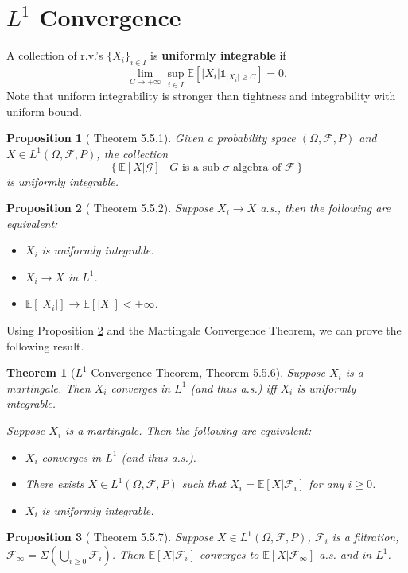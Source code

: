 \documentclass[openany]{book}
\newtheorem{proposition}{Proposition}[chapter]
\newtheorem{theorem}{Theorem}[chapter]
\theoremstyle{definition}
\theoremstyle{remark}
\begin{document}
\section{$L^1$ Convergence}
A collection of r.v.'s $\{X_i\}_{i\in I}$ is \textbf{uniformly integrable} if
\begin{equation*}
    \lim_{C\to+\infty}\sup_{i\in I}\mathbb{E}\left[|X_i|\mathds{1}_{|X_i|\ge C}\right]=0.
\end{equation*}
Note that uniform integrability is stronger than tightness and integrability with uniform bound.
\begin{proposition}[\cite{D10} Theorem 5.5.1]
    Given a probability space $(\Omega,\mathcal{F},P)$ and $X\in L^1(\Omega,\mathcal{F},P)$, the collection
    \begin{equation*}
        \left\{\mathbb{E}[X|\mathcal{G}]\middle|G\textrm{ is a sub-}\sigma\textrm{-algebra of }\mathcal{F}\right\}
    \end{equation*}
    is uniformly integrable.
\end{proposition}
\begin{proposition}[\cite{D10} Theorem 5.5.2]\label{prop:L1Converge}
    Suppose $X_i\to X$ a.s., then the following are equivalent:
    \begin{itemize}
        \item $X_i$ is uniformly integrable.
        \item $X_i\to X$ in $L^1$.
        \item $\mathbb{E}\left[|X_i|\right]\to \mathbb{E}\left[|X|\right]<+\infty$.
    \end{itemize}
\end{proposition}
Using Proposition \ref{prop:L1Converge} and the Martingale Convergence Theorem, we can prove the following result.
\begin{theorem}[$L^1$ Convergence Theorem, \cite{D10} Theorem 5.5.6]
    Suppose $X_i$ is a martingale. Then $X_i$ converges in $L^1$ (and thus a.s.) iff $X_i$ is uniformly integrable.

    Suppose $X_i$ is a martingale. Then the following are equivalent:
    \begin{itemize}
        \item $X_i$ converges in $L^1$ (and thus a.s.).
        \item There exists $X\in L^1(\Omega,\mathcal{F},P)$ such that $X_i=\mathbb{E}[X|\mathcal{F}_i]$ for any $i\ge0$.
        \item $X_i$ is uniformly integrable.
    \end{itemize}
\end{theorem}
\begin{proposition}[\cite{D10} Theorem 5.5.7]
    Suppose $X\in L^1(\Omega,\mathcal{F},P)$, $\mathcal{F}_i$ is a filtration, $\mathcal{F}_{\infty}=\Sigma\left(\bigcup_{i\ge0}\mathcal{F}_i\right)$. Then $\mathbb{E}[X|\mathcal{F}_i]$ converges to $\mathbb{E}[X|\mathcal{F}_{\infty}]$ a.s. and in $L^1$.
\end{proposition}
\end{document}
